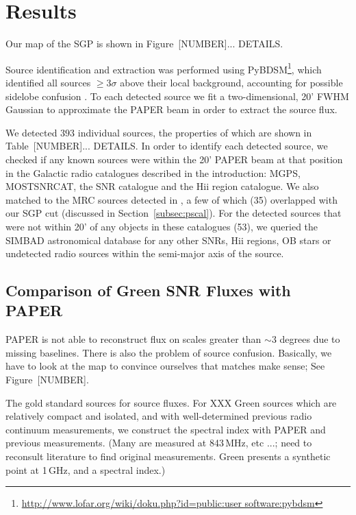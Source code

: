 \documentclass[useAMS,usenatbib]{mn2e}
\begin{document}
\section{Results}
\label{sec:res}

Our map of the SGP is shown in Figure~{\color{red}[NUMBER]... DETAILS}.

Source identification and extraction was performed using PyBDSM\footnote{\url{http://www.lofar.org/wiki/doku.php?id=public:user software:pybdsm}}, which identified all sources $\geq3\sigma$ above their local background, accounting for possible sidelobe confusion \citep{PyBDSM.15}. To each detected source we fit a two-dimensional, 20' FWHM Gaussian to approximate the PAPER beam \citep{Parsons.10} in order to extract the source flux. 

We detected $393$ individual sources, the properties of which are shown in Table~{\color{red}[NUMBER]... DETAILS}. In order to identify each detected source, we checked if any known sources were within the 20' PAPER beam at that position in the Galactic radio catalogues described in the introduction: MGPS, MOSTSNRCAT, the \cite{DAGreen.14} SNR catalogue and the \cite{Paladini.03} H{\sc ii} region catalogue. We also matched to the MRC sources detected in \cite{Jacobs.11}, a few of which (35) overlapped with our SGP cut (discussed in Section~\ref{subsec:pscal}). For the detected sources that were not within 20' of any objects in these catalogues (53), we queried the SIMBAD astronomical database \citep{Wegner.00} for any other SNRs,  H{\sc ii} regions, {\color{red}OB stars} or undetected radio sources within the semi-major axis of the source.

\subsection{Comparison of Green SNR Fluxes with PAPER}

PAPER is not able to reconstruct flux on scales greater than $\sim3$
degrees due to missing baselines.  There is also the problem of source
confusion.  Basically, we have to look at the map to convince
ourselves that matches make sense; See Figure~{\color{red}[NUMBER]}.

{\color{red} The gold standard sources for source fluxes.}
For XXX Green sources which are relatively compact
and isolated, and with well-determined previous radio continuum
measurements, we construct the spectral index with PAPER and previous
measurements.  (Many are measured at 843\,MHz, etc ...; need to
reconsult literature to find original measurements.  Green presents a
synthetic point at 1\,GHz, and a spectral index.)
\end{document}
